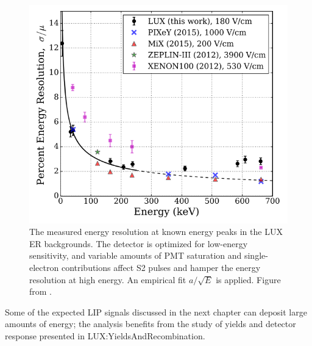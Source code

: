 \begin{figure}[htbp]
\begin{center}
\includegraphics[width=\textwidth]{figures/lux/energy_resolution.png}
\caption{The measured energy resolution at known energy peaks in the LUX ER backgrounds. The detector is optimized for low-energy sensitivity, and variable amounts of PMT saturation and single-electron contributions affect S2 pulses and hamper the energy resolution at high energy. An empirical fit $a / \sqrt{E} $ is applied. Figure from \cite{LUX:YieldsAndRecombination}.}
\label{fig:energy_resolution}
\end{center}
\end{figure}

Some of the expected \ac{LIP} signals discussed in the next chapter can deposit large amounts of energy; the analysis benefits from the study of yields and detector response presented in \ac{LUX:YieldsAndRecombination}.


